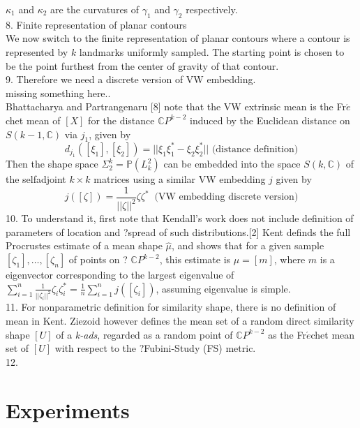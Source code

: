 \documentclass[12pt]{article}
\theoremstyle{definition}
\theoremstyle{remark}
\numberwithin{equation}{section}
\begin{document}
$\kappa_1$ and $\kappa_2$ are the curvatures of $\gamma_1$ and $\gamma_2$ respectively. \\[0.2cm]
8. Finite representation of planar contours\\[0.2cm]
We now switch to the finite representation of planar contours where a contour is represented by $k$ landmarks uniformly sampled. The starting point is chosen to be the point furthest from the center of gravity of that contour. \\[0.2cm]
9. Therefore we need a discrete version of VW embedding. \\[0.2cm]
missing something here..\\[0.2cm]
Bhattacharya and Partrangenaru [8] note that the VW extrinsic mean is the Fr$\acute{e}$chet mean of $[X]$ for the distance $\mathbb{C}P^{k-2}$ induced by the Euclidean distance on $S(k-1, \mathbb{C})$ via $j_1$, given by 
\[d_{j_1}([\xi_1],[\xi_2]) = ||\xi_1\xi_1^* - \xi_2\xi_2^*|| \text{ (distance definition)}\] 
Then the shape space $\Sigma_2^k = \mathbb{P}(L_k^2)$ can be embedded into the space $S(k,\mathbb{C})$ of the selfadjoint $k\times k $ matrices using a similar VW embedding $j$ given by 
\[j([\zeta])= \frac{1}{||\zeta||^2}\zeta\zeta^*\ \text{ (VW embedding discrete version)}\]
10. To understand it, first note that Kendall's work does not include definition of parameters of location and ?spread of such distributions.[2] Kent definds the full Procrustes estimate of a mean shape $\hat{\mu}$, and shows that for a given sample $[\zeta_1],\dots,[\zeta_n]$ of points on ? $\mathbb{C}P^{k-2}$, this estimate is $\mu = [m]$, where $m$ is a eigenvector corresponding to the largest eigenvalue of $\sum_{i=1}^n\frac{1}{||\zeta_i||^2}\zeta_i\zeta_i^* = \frac{1}{n}\sum_{i=1}^n j([\zeta_i])$, assuming eigenvalue is simple.\\[0.2cm]
11. For nonparametric definition for similarity shape, there is no definition of mean in Kent. Ziezoid however defines the mean set of a random direct similarity shape $[U]$ of a \emph{k-ads}, regarded as a random point of $\mathbb{C}P^{k-2}$ as the Fr$\acute{e}$chet mean set of $[U]$ with respect to the ?Fubini-Study (FS) metric. \\[0.2cm]
12. 
\section{Experiments}
\end{document}
